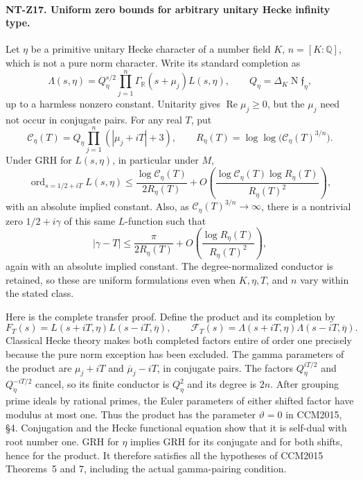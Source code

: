 \paragraph{NT-Z17. Uniform zero bounds for arbitrary unitary Hecke infinity type.}
Let $\eta$ be a primitive unitary Hecke character of a number field
$K$, $n=[K:\mathbb Q]$, which is not a pure norm character.
Write its standard completion as
\[
 \Lambda(s,\eta)=Q_\eta^{s/2}
         \prod_{j=1}^n\Gamma_{\mathbb R}(s+\mu_j)L(s,\eta),
 \qquad Q_\eta=\Delta_K\operatorname N\mathfrak f_\eta,
\]
up to a harmless nonzero constant.  Unitarity gives
$\operatorname{Re}\mu_j\ge0$, but the $\mu_j$ need not occur
in conjugate pairs.  For any real $T$, put
\[
 \mathscr C_\eta(T)=Q_\eta\prod_{j=1}^n(|\mu_j+iT|+3),
 \qquad
 R_\eta(T)=\log\log\bigl(\mathscr C_\eta(T)^{3/n}\bigr).
\]
Under GRH for $L(s,\eta)$, in particular under $M$,
\[
 \operatorname{ord}_{s=1/2+iT}L(s,\eta)
 \le\frac{\log\mathscr C_\eta(T)}{2R_\eta(T)}
  +O\left(\frac{\log\mathscr C_\eta(T)\log R_\eta(T)}
                 {R_\eta(T)^2}\right),
\tag{NT-Z17a}
\]
with an absolute implied constant.  Also, as
$\mathscr C_\eta(T)^{3/n}\to\infty$, there is a nontrivial zero
$1/2+i\gamma$ of this same $L$-function such that
\[
 |\gamma-T|\le\frac{\pi}{2R_\eta(T)}
                 +O\left(\frac{\log R_\eta(T)}{R_\eta(T)^2}\right),
\tag{NT-Z17b}
\]
again with an absolute implied constant.  The degree-normalized
conductor is retained, so these are uniform formulations even when
$K,\eta,T$, and $n$ vary within the stated class.

Here is the complete transfer proof.  Define the product and its
completion by
\[
 F_T(s)=L(s+iT,\eta)L(s-iT,\overline\eta),\qquad
 \mathcal F_T(s)=\Lambda(s+iT,\eta)
                         \Lambda(s-iT,\overline\eta).
\]
Classical Hecke theory makes both completed factors entire of order
one precisely because the pure norm exception has been excluded.
The gamma parameters of the product are
$\mu_j+iT$ and $\overline\mu_j-iT$, in conjugate pairs.
The factors $Q_\eta^{iT/2}$ and $Q_\eta^{-iT/2}$ cancel, so its
finite conductor is $Q_\eta^2$ and its degree is $2n$.
After grouping prime ideals by rational primes, the Euler parameters
of either shifted factor have modulus at most one.  Thus the product
has the parameter $\vartheta=0$ in CCM2015, \S4.  Conjugation and
the Hecke functional equation show that it is self-dual with root
number one.  GRH for $\eta$ implies GRH for its conjugate and for
both shifts, hence for the product.  It therefore satisfies all
the hypotheses of CCM2015 Theorems~5 and 7, including the actual
gamma-pairing condition.

